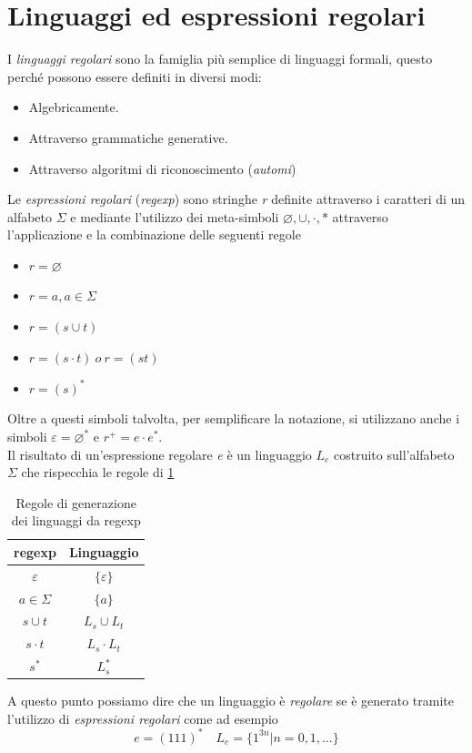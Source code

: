 \section{Linguaggi ed espressioni regolari}
I \emph{linguaggi regolari} sono la famiglia più semplice di linguaggi formali, questo perché possono essere definiti in diversi modi:
\begin{itemize}
	\item Algebricamente.
	\item Attraverso grammatiche generative.
	\item Attraverso algoritmi di riconoscimento (\emph{automi})
\end{itemize}
Le \emph{espressioni regolari} (\emph{regexp}) sono stringhe \emph{r} definite attraverso i caratteri di un alfabeto $ \Sigma $ e mediante l'utilizzo dei meta-simboli $ \varnothing, \cup, \cdot, \ast $ attraverso l'applicazione e la combinazione delle seguenti regole
\begin{itemize}
	\item $ r= \varnothing $
	\item $ r = a, a\in \Sigma $
	\item $ r = (s \cup t) $
	\item $ r = (s\cdot t) \ o \ r = (st) $
	\item $ r = (s)^\ast $
\end{itemize}
Oltre a questi simboli talvolta, per semplificare la notazione, si utilizzano anche i simboli $ \varepsilon = \varnothing^\ast$ e $ r^+ = e\cdot e^\ast $.\\
Il risultato di un'espressione regolare \emph{e} è un linguaggio $ L_e $ costruito sull'alfabeto $ \Sigma $ che rispecchia le regole di \tablename\ref{tab:reggen}
\begin{table}
	\centering
\begin{tabular}{|c|c|}
	\hline \textbf{regexp} & \textbf{Linguaggio} \\ 
	\hline $ \varepsilon $ & $ \{\varepsilon\} $ \\ 
	\hline $ a\in\Sigma $ & $ \{a\} $ \\ 
	\hline $ s\cup t $ & $ L_s \cup L_t $ \\ 
	\hline $ s\cdot t $ & $ L_s\cdot L_t $ \\ 
	\hline $ s^\ast $ & $ L_s^\ast $ \\ 
	\hline 
\end{tabular}
\caption{Regole di generazione dei linguaggi da regexp}\label{tab:reggen}
\end{table}
A questo punto possiamo dire che un linguaggio è \emph{regolare} se è generato tramite l'utilizzo di \emph{espressioni regolari} come ad esempio
$$ e = (111)^* \quad L_e=\{1^{3n}|n = 0,1,\dots \} $$
